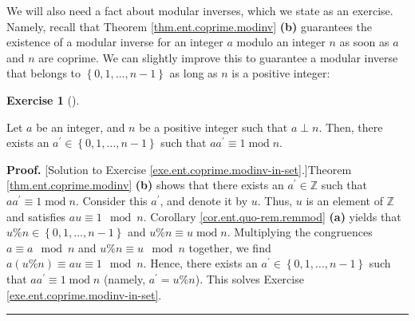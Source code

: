\documentclass[numbers=enddot,12pt,final,onecolumn,notitlepage]{scrartcl}%
\newcounter{exer}
\numberwithin{exer}{subsection}
\theoremstyle{definition}
\newtheorem{exmp}[exer]{Exercise}
\newenvironment{exercise}[1][]
{\begin{exmp}[#1]\begin{leftbar}}
{\end{leftbar}\end{exmp}}
\newenvironment{fineprint}{\begin{small}}{\end{small}}
\newenvironment{proof}[1][Proof]{\noindent\textbf{#1.} }{\ \rule{0.5em}{0.5em}}
\newenvironment{noncompile}{}{}
\begin{document}
\begin{noncompile}
We will also need a fact about modular inverses, which we state as an
exercise. Namely, recall that Theorem \ref{thm.ent.coprime.modinv}
\textbf{(b)} guarantees the existence of a modular inverse for an integer $a$
modulo an integer $n$ as soon as $a$ and $n$ are coprime. We can slightly
improve this to guarantee a modular inverse that belongs to $\left\{  0, 1,
\ldots, n-1 \right\}  $ as long as $n$ is a positive integer:

\begin{exercise}
\label{exe.ent.coprime.modinv-in-set}Let $a$ be an integer, and $n$ be a
positive integer such that $a \perp n$. Then, there exists an $a^{\prime}%
\in\left\{  0,1,\ldots,n-1 \right\}  $ such that $aa^{\prime}\equiv
1\operatorname{mod}n$.
\end{exercise}

\begin{fineprint}
\begin{proof}
[Solution to Exercise \ref{exe.ent.coprime.modinv-in-set}.]Theorem
\ref{thm.ent.coprime.modinv} \textbf{(b)} shows that there exists an
$a^{\prime}\in\mathbb{Z}$ such that $aa^{\prime}\equiv1\operatorname{mod}n$.
Consider this $a^{\prime}$, and denote it by $u$. Thus, $u$ is an element of
$\mathbb{Z}$ and satisfies $au \equiv1 \mod n$. Corollary
\ref{cor.ent.quo-rem.remmod} \textbf{(a)} yields that $u\%n\in\left\{
0,1,\ldots,n-1\right\}  $ and $u\%n\equiv u\operatorname{mod}n$. Multiplying
the congruences $a \equiv a \mod n$ and $u \% n \equiv u \mod n$ together, we
find $a \left(  u\%n \right)  \equiv au \equiv1 \mod n$. Hence, there exists
an $a^{\prime}\in\left\{  0,1,\ldots,n-1 \right\}  $ such that $aa^{\prime
}\equiv1\operatorname{mod}n$ (namely, $a^{\prime} = u \% n$). This solves
Exercise \ref{exe.ent.coprime.modinv-in-set}.
\end{proof}
\end{fineprint}
\end{noncompile}
\end{document}
